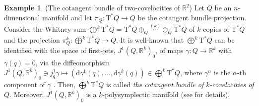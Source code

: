 \documentclass[11pt]{article}
\theoremstyle{plain}
\theoremstyle{definition}
\newtheorem{example}[theorem]{Example}
\newcommand{\R}{\mathbb{R}}
\newcommand{\cT}{\mathrm{T}^\ast}
\renewcommand{\d}{\mathrm{d}}
\def\d{\mathrm{d}}
\DeclareMathOperator{\pr}{pr}
\numberwithin{equation}{section}
\begin{document}
\begin{example}{(The cotangent bundle of two-covelocities of $\R^2$)} Let $Q$ be an $n$-dimensional manifold  and let $\pi_Q: \cT Q\rightarrow Q$ be the cotangent bundle projection. Consider the Whitney sum $\bigoplus^k\cT Q=\cT Q\oplus_{Q}\overset{(k)}{\dotsb} \oplus_{Q}\cT Q$ of $k$ copies of $\cT Q$ and the projection $\pi^k_Q:\bigoplus^k \cT Q\rightarrow Q$. It is well-known that $\bigoplus^k\cT Q$ can be identified with the space of first-jets, $J^1(Q,\R^k)_0$, of maps $\gamma:Q\rightarrow \R^k$ with $\gamma(q)=0$, via  the diffeomorphism $J^1(Q,\R^k)_0\ni j^1_q\gamma\mapsto \left( \d\gamma^1(q),\ldots, \d\gamma^k(q)\right)\in\bigoplus^k\cT Q$, where %
 $\gamma^\alpha$ is the $\alpha$-th component of $\gamma$ \cite{LSV_15}. %
 Then, $\bigoplus^k \cT Q$ is called {\it the cotangent bundle of $k$-covelocities of $Q$}. Moreover, $J^1(Q,\R^k)_0$ is a $k$-polysymplectic manifold (see \cite{LSV_15} for details).


\end{example}
\end{document}
